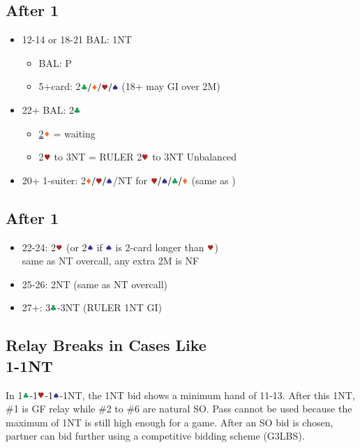 \documentclass{article}
\begin{document}
\begin{multicols}{2}
\subsection{After 1\SSS}
\label{sec:1c1d1h1s}
\begin{itemize}
    \item 12-14 or 18-21 BAL: 1NT
    \begin{itemize}
        \item BAL: P
        \item 5+card: 2$\ccc/\ddd/\hhh/\sss$ (18+ may GI over 2M)
    \end{itemize}
    \item 22+ BAL: 2$\ccc$
    \begin{itemize}
        \item \hyperref[sec:1c1d1h1s2c2d]{2$\ddd$} = waiting
        \item 2$\hhh$ to 3NT = RULER 2$\hhh$ to 3NT Unbalanced
    \end{itemize}
    \item 20+ 1-suiter: 2$\ddd/\hhh/\sss$/NT for $\hhh/\sss/\ccc/\ddd$ (same as )
\end{itemize}

\subsection{After 1\DDD}
\label{sec:1c1d1h1s2c2d}
\begin{itemize}
    \item 22-24: 2$\hhh$ (or 2$\sss$ if $\sss$ is 2-card longer than $\hhh$) \\
        same as NT overcall, any extra 2M is NF
    \item 25-26: 2NT (same as NT overcall)
    \item 27+: 3$\ccc$-3NT (RULER 1NT GI)
\end{itemize}

\subsection{Relay Breaks in Cases Like \texorpdfstring{\\}{}
1\SSS-1NT}
In 1$\ccc$-1$\hhh$-1$\sss$-1NT, the 1NT bid shows a minimum hand of 11-13. After this 1NT, \#1 is GF relay while \#2 to \#6 are natural SO. Pass cannot be used because the maximum of 1NT is still high enough for a game. After an SO bid is chosen, partner can bid further using a competitive bidding scheme (G3LBS).


\end{multicols}
\end{document}
